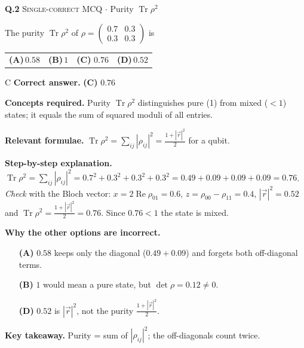 \documentclass[11pt,a4paper]{article}
\newcommand{\optlabel}[1]{\textbf{(#1)}}
\newcommand{\correctlabel}[1]{\textcolor{okgreen}{\textbf{(#1)}\,\ding{51}}}
\newenvironment{qitem}[1]{\begin{list}{}{\setlength{\leftmargin}{3.3em}\setlength{\labelwidth}{3.1em}%
  \setlength{\labelsep}{0.2em}\setlength{\topsep}{3pt}\setlength{\parsep}{3pt}}\item[\textbf{Q.#1}\hfill]}{\end{list}}
\newcommand{\qsep}{\par\vspace{2pt}{\color{black!15}\hrule}\vspace{4pt}}
\newcommand{\qmeta}[2]{{\footnotesize\color{black!60}\textsc{#1} \;$\cdot$\; #2}\par}
\begin{document}
\begin{qitem}{2}
\qmeta{Single-correct MCQ}{Purity $\operatorname{Tr}\rho^2$}
The purity $\operatorname{Tr}\rho^2$ of $\rho = \begin{pmatrix}0.7 & 0.3\\ 0.3 & 0.3\end{pmatrix}$ is
\par\smallskip\noindent\begin{tabularx}{\linewidth}{@{}*{4}{L}@{}}
\optlabel{A}\,$0.58$ & \optlabel{B}\,$1$ & \correctlabel{C}\,$0.76$ & \optlabel{D}\,$0.52$
\end{tabularx}
\end{qitem}
\begin{solbox}{C}
\textbf{\color{brand}Correct answer.} \textcolor{okgreen}{\textbf{(C)}} $0.76$

\textbf{\color{brand}Concepts required.} Purity $\operatorname{Tr}\rho^2$ distinguishes pure (1) from mixed ($<1$) states; it equals the sum of squared moduli of all entries.

\textbf{\color{brand}Relevant formulae.} $\operatorname{Tr}\rho^2 = \sum_{ij}|\rho_{ij}|^2 = \frac{1 + |\vec r|^2}{2}$ for a qubit.

\textbf{\color{brand}Step-by-step explanation.} $\operatorname{Tr}\rho^2 = \sum_{ij}|\rho_{ij}|^2 = 0.7^2 + 0.3^2 + 0.3^2 + 0.3^2 = 0.49 + 0.09 + 0.09 + 0.09 = 0.76$.
\emph{Check} with the Bloch vector: $x = 2\operatorname{Re}\rho_{01} = 0.6$, $z = \rho_{00} - \rho_{11} = 0.4$, $|\vec r|^2 = 0.52$ and
$\operatorname{Tr}\rho^2 = \frac{1 + |\vec r|^2}{2} = 0.76$. Since $0.76 < 1$ the state is mixed.

\textbf{\color{brand}Why the other options are incorrect.}
\begin{itemize}[leftmargin=2.4em, itemsep=1pt, topsep=2pt]
\item[\textbf{(A)}] $0.58$ keeps only the diagonal ($0.49 + 0.09$) and forgets both off-diagonal terms.
\item[\textbf{(B)}] $1$ would mean a pure state, but $\det\rho = 0.12 \neq 0$.
\item[\textbf{(D)}] $0.52$ is $|\vec r|^2$, not the purity $\frac{1 + |\vec r|^2}{2}$.
\end{itemize}
\textbf{\color{brand}Key takeaway.} Purity = sum of $|\rho_{ij}|^2$; the off-diagonals count twice.
\end{solbox}
\qsep
\end{document}
